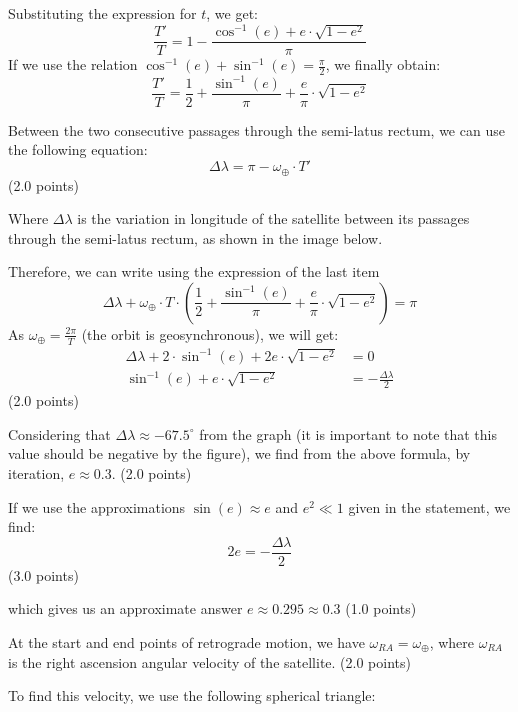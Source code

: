 \begin{description}
  Substituting the expression for $t$, we get:
  \[
    \frac{T'}{T} = 1 - \frac{\cos^{-1}(e) + e\cdot\sqrt{1 - e^2}}{\pi}
  \]
  If we use the relation $\cos^{-1}(e) + \sin^{-1}(e) = \frac{\pi}{2}$, we
  finally obtain:
  \[
    \boxed{\frac{T'}{T} = \frac{1}{2} + \frac{\sin^{-1}(e)}{\pi}
      + \frac{e}{\pi}\cdot\sqrt{1 - e^2}}
  \]

\item[(h)] Between the two consecutive passages through the semi-latus rectum,
  we can use the following equation:
  \[
    \Delta\lambda = \pi - \omega_\oplus\cdot T'
  \]
  \hfill(2.0 points)

  Where $\Delta\lambda$ is the variation in longitude of the satellite between
  its passages through the semi-latus rectum, as shown in the image below.


  Therefore, we can write using the expression of the last item
  \[
    \Delta\lambda + \omega_\oplus\cdot T\cdot
      \left(\frac{1}{2} + \frac{\sin^{-1}(e)}{\pi}
      + \frac{e}{\pi}\cdot\sqrt{1 - e^2}\right) = \pi
  \]
  As $\omega_\oplus = \frac{2\pi}{T}$ (the orbit is geosynchronous), we will
  get:
  \begin{align*}
    \Delta\lambda + 2\cdot\sin^{-1}(e) + 2e\cdot\sqrt{1 - e^2} &= 0 \\
    \sin^{-1}(e) + e\cdot\sqrt{1 - e^2} &= -\frac{\Delta\lambda}{2}
  \end{align*}
  \hfill(2.0 points)

  Considering that $\Delta\lambda \approx -67.5^\circ$ from the graph (it is
  important to note that this value should be negative by the figure), we find
  from the above formula, by iteration, $\boxed{e \approx 0.3}$.
  \hfill(2.0 points)

  If we use the approximations $\sin(e) \approx e$ and $e^2 \ll 1$ given in
  the statement, we find:
  \[
    2e = -\frac{\Delta\lambda}{2}
  \]
  \hfill(3.0 points)

  which gives us an approximate answer $\boxed{e \approx 0.295 \approx 0.3}$
  \hfill(1.0 points)

\item[(i)] At the start and end points of retrograde motion, we have
  $\omega_{RA} = \omega_\oplus$, where $\omega_{RA}$ is the right ascension
  angular velocity of the satellite. \hfill(2.0 points)

  To find this velocity, we use the following spherical triangle:


\end{description}
